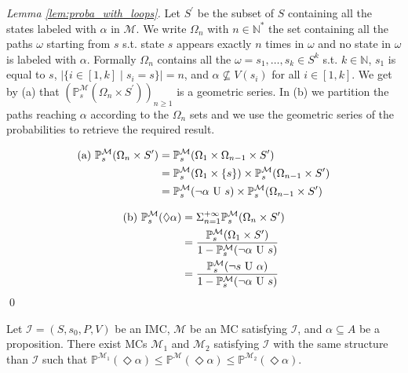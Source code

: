 \documentclass{llncs}
\newcommand{\mc}{\textnormal{MC}}
\newcommand{\imc}{\textnormal{IMC}}
\newcommand{\Nset}             {\ensuremath{\mathbb{N}}}
\newcommand{\Proba}            {\ensuremath{\mathbb{P}}}
\newcommand{\ltlUntil}{\textnormal{ U }}
\newcommand{\ltlExists}{\ensuremath{\Diamond}}
\begin{document}
\begin{proof}[Lemma \ref{lem:proba_with_loops}]
	Let $S^\prime$ be the subset of $S$ containing
    all the states labeled with $\alpha$ in $\mathcal{M}$.
	We write $\Omega_n$ with $n \in \Nset^*$ the set containing all the paths $\omega$ starting from $s$ s.t. state $s$ appears exactly $n$ times in $\omega$ and no state in $\omega$ is labeled with $\alpha$.
    Formally $\Omega_n$ contains all the 
    $\omega = s_1, \ldots, s_k \in S^k$
    s.t. $k \in \Nset$, $s_1$ is equal to $s$, 
    $|\{ i \in [1,k] \mid s_i = s \}| = n$, and
    $\alpha \not\subseteq V(s_i)$ for all $i \in [1,k]$.
    We get by (a) that $(\Proba^\mathcal{M}_s(\Omega_n \times S^\prime))_{n \geq 1}$ is a geometric series.
	In (b) we partition the paths reaching $\alpha$
    according to the $\Omega_n$ sets 
    and we use the geometric series of the probabilities to retrieve the required result.
    
	\begin{align*}
    	\text{(a)~} \Proba^\mathcal{M}_s(\Omega_n \times S^\prime) &
        = \Proba^\mathcal{M}_s(\Omega_1 \times \Omega_{n-1} \times S^\prime)
        \\
        & = %
        \Proba^\mathcal{M}_s(\Omega_1 \times \{ s \}) \times
		\Proba^\mathcal{M}_s(\Omega_{n-1} \times S^\prime)
       	\\
        & = %
        \Proba^\mathcal{M}_s(\neg\alpha \ltlUntil s) \times
		\Proba^\mathcal{M}_s(\Omega_{n-1} \times S^\prime)
	\end{align*}
    
    \begin{align*}
    	\text{(b)~} \Proba^\mathcal{M}_s(\ltlExists \alpha) &
    	= \Sigma_{n = 1}^{+\infty} \Proba^\mathcal{M}_s(\Omega_n \times S^\prime)
        \\
        & = 
        \frac{
        	\Proba^\mathcal{M}_s(\Omega_1 \times S^\prime)}{
        	1 - \Proba^\mathcal{M}_s(\neg\alpha \ltlUntil s)}
        \\
        & = 
        \frac{
        	\Proba^\mathcal{M}_s(\neg s \ltlUntil \alpha)}{
        	1 - \Proba^\mathcal{M}_s(\neg\alpha \ltlUntil s)}
	\end{align*}
    \qed
\end{proof}


\begin{lemma}\label{lem:min_max_reachability}
	Let $\mathcal{I} = (S,s_0,P,V)$ be an {\imc},
	$\mathcal{M}$ be an {\mc} satisfying $\mathcal{I}$, and
	$\alpha \subseteq A$ be a proposition.
	There exist {\mc}s $\mathcal{M}_1$ and $\mathcal{M}_2$ satisfying $\mathcal{I}$ with the same structure than $\mathcal{I}$
	 such that
	$\Proba^{\mathcal{M}_1}(\ltlExists \alpha) \leq \Proba^{\mathcal{M}}(\ltlExists \alpha) \leq
	\Proba^{\mathcal{M}_2}(\ltlExists \alpha)$.
\end{lemma}
\end{document}
